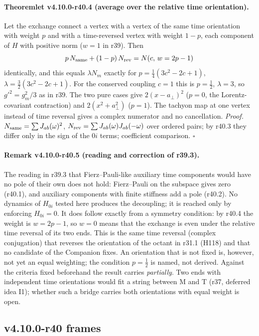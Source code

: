 \paragraph{Theoremlet v4.10.0-r40.4 (average over the relative time orientation).}
Let the exchange connect a vertex with a vertex of the same time orientation with weight \(p\) and with a time-reversed vertex with weight \(1-p\),
each component of \(H\) with positive norm (\(w=1\) in r39).  Then
\[
 p\,N_{\rm same}+(1-p)\,N_{\rm rev}=N(c,\,w=2p-1)
\]
identically, and this equals \(\lambda N_m\) exactly for \(p=\tfrac14(3c^2-2c+1)\), \(\lambda=\tfrac32(3c^2-2c+1)\).  For the conserved coupling \(c=1\) this is
\(p=\tfrac12\), \(\lambda=3\), so \(g'^2=g_m^2/3\) as in r39.  The two pure cases give \(2(x-a_\perp)^2\) (\(p=0\), the Lorentz-covariant contraction) and
\(2(x^2+a_\perp^2)\) (\(p=1\)).  The tachyon map at one vertex instead of time reversal gives a complex numerator and no cancellation.
\emph{Proof.} \(N_{\rm same}=\sum J_{ab}(\omega)^2\), \(N_{\rm rev}=\sum J_{ab}(\omega)J_{ab}(-\omega)\) over ordered pairs; by r40.3 they differ only in the sign of the
\(0i\) terms; coefficient comparison.  \(\square\)

\paragraph{Remark v4.10.0-r40.5 (reading and correction of r39.3).}
The reading in r39.3 that Fierz--Pauli-like auxiliary time components would have no pole of their own does not hold: Fierz--Pauli on the subspace
gives zero (r40.1), and auxiliary components with finite stiffness add a pole (r40.2).  No dynamics of \(H_{0i}\) tested here produces the decoupling;
it is reached only by enforcing \(H_{0i}=0\).  It does follow exactly from a symmetry condition: by r40.4 the weight is \(w=2p-1\), so \(w=0\) means that
the exchange is even under the relative time reversal of its two ends.  This is the same time reversal (complex conjugation) that reverses the
orientation of the octant in r31.1 (H118) and that no candidate of the Companion fixes.  An orientation that is not fixed is, however, not yet an
equal weighting; the condition \(p=\tfrac12\) is named, not derived.  Against the criteria fixed beforehand the result carries \emph{partially}.
Two ends with independent time orientations would fit a string between M and T (r37, deferred idea I1); whether such a bridge carries both
orientations with equal weight is open.

\subsection*{v4.10.0-r40 frames}
\label{subsec:v4100-r40-frames}

